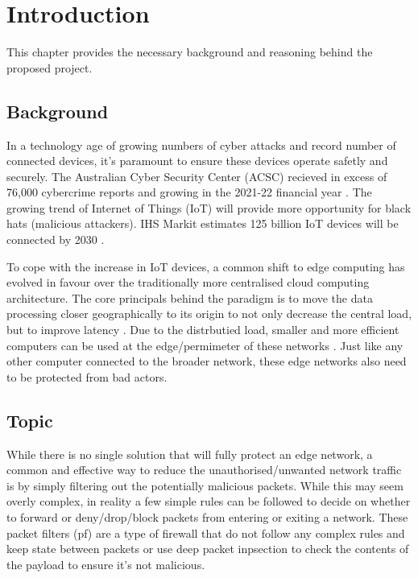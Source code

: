 \chapter[Introduction]{Introduction}
\label{Chap:Intro}




This chapter provides the necessary background and reasoning behind the proposed project. 

\section{Background }


In a technology age of growing numbers of cyber attacks and record number of connected devices, it's 
paramount to ensure these devices operate safetly and securely. The Australian Cyber Security Center (ACSC) recieved in 
excess of 76,000 cybercrime reports and growing in the 2021-22 financial year \cite{acsc_2022}. The growing trend of Internet of Things (IoT) will provide 
more opportunity for black hats (malicious attackers). IHS Markit estimates 125 billion IoT devices will be connected by 2030 \cite{IHS_iot}. 

To cope with the increase in IoT devices, a common shift to edge computing has evolved in favour over the traditionally more centralised cloud computing 
architecture. The core principals behind the paradigm is to move the data processing closer geographically to its origin to not only decrease the 
central load, but to improve latency \cite{EdgeComputingPerspectives}. Due to the distrbutied load, smaller and more efficient computers can be used 
at the edge/permimeter of these networks \cite{EdgeComputingPerspectives}. Just like any other computer connected to the broader network, these 
edge networks also need to be protected from bad actors.



\section{Topic}

While there is no single solution that will fully protect an edge network, a common and effective way to reduce the unauthorised/unwanted network 
traffic is by simply filtering out the potentially malicious packets. While this may seem overly complex, in reality a few simple rules can be followed
to decide on whether to forward or deny/drop/block packets from entering or exiting a network. These packet filters (pf) are a type of firewall that do 
not follow any complex rules and keep state between packets or use deep packet inpsection to check the contents of the payload to ensure it's not 
malicious. 

